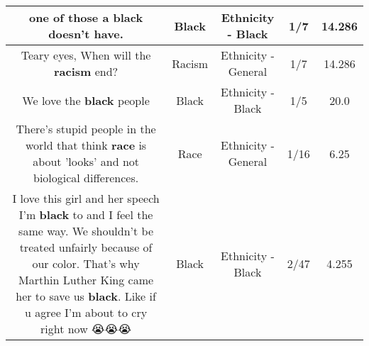 \documentclass[11pt]{article}
\newlength\mylength
\begin{document}
\begin{center}
\begin{longtable}{|C{.65\mylength}|C{.30\mylength}|C{.12\mylength}|C{.12\mylength}|C{.12\mylength}|}
  \small one of those a \textbf{black} doesn't have.\normalsize   & Black & Ethnicity - Black & 1/7 & 14.286 \\  \hline
  \small Teary eyes, When will the \textbf{racism} end?\normalsize   & Racism & Ethnicity - General & 1/7 & 14.286 \\  \hline
  \small We love the \textbf{black} people\normalsize   & Black & Ethnicity - Black & 1/5 & 20.0 \\  \hline
  \small There's stupid people in the world that think \textbf{race} is about 'looks' and not biological differences.\normalsize   & Race & Ethnicity - General & 1/16 & 6.25 \\  \hline
  \small I love this girl and her speech I'm \textbf{black} to and I feel the same way. We shouldn't be treated unfairly because of our color. That's why  Marthin Luther King  came her to save us \textbf{black}. Like if u agree I'm about to cry right now 😭😭😭\normalsize   & Black & Ethnicity - Black & 2/47 & 4.255 \\  \hline

\end{longtable}
\end{center}
\end{document}

